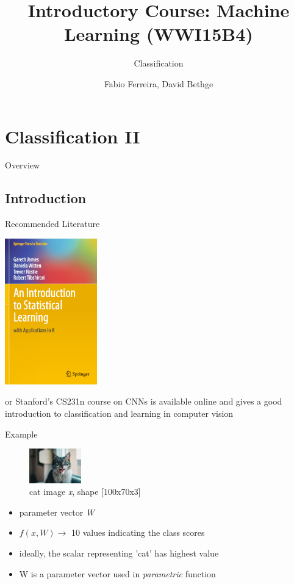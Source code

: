 \documentclass{beamer}
\title[]{Introductory Course: Machine Learning (WWI15B4)}
\subtitle{Classification \rom{2}}
\author{Fabio Ferreira, David Bethge}
\institute{DHBW Karlsruhe}
\date{}
\begin{document}
%
%

\begin{frame}
  \titlepage
\end{frame}



\section{Classification II}
\begin{frame}{Overview}
\tableofcontents
\end{frame}

\subsection{Introduction}
\begin{frame}{Recommended Literature}
\begin{center}
\includegraphics[width=0.3\textwidth]{classification_book}
\end{center}
or Stanford's CS231n course on CNNs is available online and gives a good introduction to classification and learning in computer vision
\end{frame}

\begin{frame}{Example}
\begin{figure}
\includegraphics[width=0.2\textwidth]{cat}
\caption{cat image \emph{x}, shape [100x70x3]} 
\end{figure}


\begin{itemize}
\item parameter vector \emph{W}
\item $f(x,W) \longrightarrow$ 10 values indicating the class scores
\item ideally, the scalar representing 'cat' has highest value
\item W is a parameter vector used in \emph{parametric} function
\end{itemize}
\end{frame}
\end{document}
